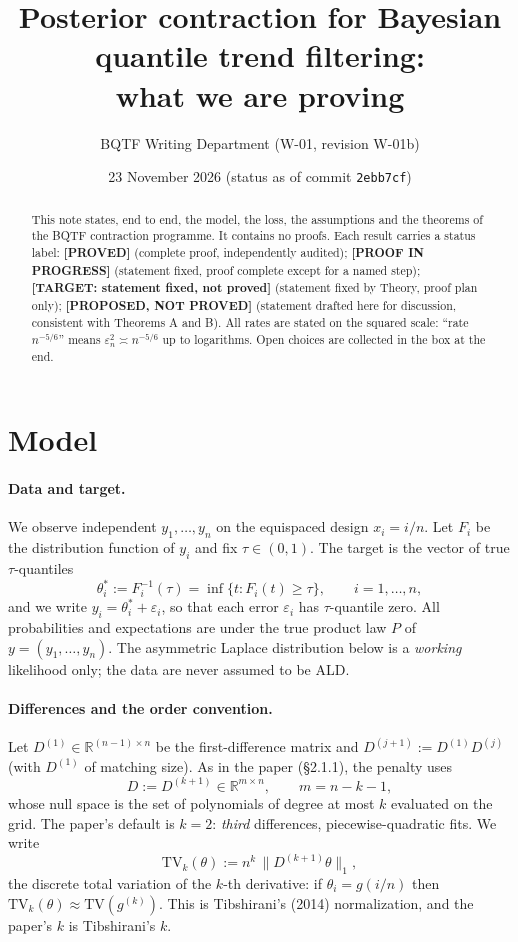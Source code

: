 \documentclass[11pt]{article}
\title{Posterior contraction for Bayesian quantile trend filtering:\\ what we are proving}
\author{BQTF Writing Department (W-01, revision W-01b)}
\date{23 November 2026 \quad (status as of commit \texttt{2ebb7cf})}
\newcommand{\R}{\mathbb{R}}
\newcommand{\norm}[1]{\lVert #1\rVert}
\newcommand{\Dk}{D^{(k+1)}}
\newcommand{\TV}{\mathrm{TV}}
\newcommand{\stPROVED}{\textcolor{proved}{\textsf{\textbf{[PROVED]}}}}
\newcommand{\stPROGRESS}{\textcolor{progress}{\textsf{\textbf{[PROOF IN PROGRESS]}}}}
\newcommand{\stTARGET}{\textcolor{target}{\textsf{\textbf{[TARGET: statement fixed, not proved]}}}}
\newcommand{\stPROPOSED}{\textcolor{proposed}{\textsf{\textbf{[PROPOSED, NOT PROVED]}}}}
\theoremstyle{plain}
\theoremstyle{definition}
\theoremstyle{remark}
\begin{document}
\maketitle

\begin{abstract}
\noindent This note states, end to end, the model, the loss, the assumptions and the theorems of the BQTF contraction programme. It contains no proofs. Each result carries a status label:
\stPROVED{} (complete proof, independently audited);
\stPROGRESS{} (statement fixed, proof complete except for a named step);
\stTARGET{} (statement fixed by Theory, proof plan only);
\stPROPOSED{} (statement drafted here for discussion, consistent with Theorems A and B).
All rates are stated on the squared scale: ``rate $n^{-5/6}$'' means $\varepsilon_n^2 \asymp n^{-5/6}$ up to logarithms. Open choices are collected in the box at the end.
\end{abstract}

\section{Model}
\label{sec:model}

\paragraph{Data and target.} We observe independent $y_1,\dots,y_n$ on the equispaced design $x_i = i/n$. Let $F_i$ be the distribution function of $y_i$ and fix $\tau\in(0,1)$. The target is the vector of true $\tau$-quantiles
\[
\theta^*_i := F_i^{-1}(\tau) = \inf\{t : F_i(t)\ge\tau\}, \qquad i=1,\dots,n,
\]
and we write $y_i = \theta^*_i + \varepsilon_i$, so that each error $\varepsilon_i$ has $\tau$-quantile zero. All probabilities and expectations are under the true product law $P$ of $y=(y_1,\dots,y_n)$. The asymmetric Laplace distribution below is a \emph{working} likelihood only; the data are never assumed to be ALD.

\paragraph{Differences and the order convention.} Let $D^{(1)}\in\R^{(n-1)\times n}$ be the first-difference matrix and $D^{(j+1)} := D^{(1)}D^{(j)}$ (with $D^{(1)}$ of matching size). As in the paper (\S2.1.1), the penalty uses
\[
D := \Dk \in \R^{m\times n}, \qquad m = n-k-1,
\]
whose null space is the set of polynomials of degree at most $k$ evaluated on the grid. The paper's default is $k=2$: \emph{third} differences, piecewise-quadratic fits. We write
\[
\TV_k(\theta) := n^{k}\,\norm{\Dk\theta}_1,
\]
the discrete total variation of the $k$-th derivative: if $\theta_i = g(i/n)$ then $\TV_k(\theta)\approx \TV(g^{(k)})$. This is Tibshirani's (2014) normalization, and the paper's $k$ is Tibshirani's $k$.
\end{document}
